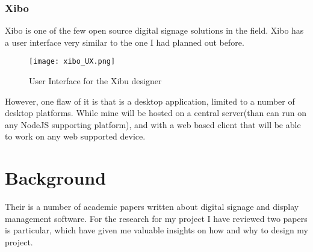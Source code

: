 \documentclass{article}
\begin{document}
\subsubsection{Xibo}
Xibo is one of the few open source digital signage solutions in the field. Xibo has a user interface very similar to the one I had planned out before.
\begin{figure}[h]
    \centering
    \texttt{[image: xibo\_UX.png]}
    \caption{User Interface for the Xibu designer}
    \label{fig:my_label}
\end{figure}
However, one flaw of it is that is a desktop application, limited to a number of desktop platforms. While mine will be hosted on a central server(than can run on any NodeJS supporting platform), and with a web based client that will be able to work on any web supported device.




\section{Background}
Their is a number of  academic papers written about digital signage and display management software. For the research for my project I have reviewed two papers is particular, which have given me valuable insights on how and why to design my project.
\end{document}

